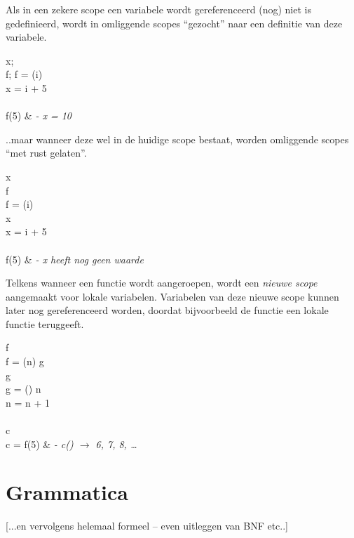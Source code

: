 Als in een zekere scope een variabele wordt gereferenceerd (nog) niet is gedefinieerd, wordt in omliggende scopes ``gezocht'' naar een definitie van deze variabele.

	\begin{SyntaxExample}
		\VAR x; \\
		\VAR f;\; f = \FUN(i) \\
		\IN x = i + 5 \\
		\\
		f(5) & \textit{- x = 10}
	\end{SyntaxExample}

..maar wanneer deze wel in de huidige scope bestaat, worden omliggende scopes ``met rust gelaten''.

	\begin{SyntaxExample}
		\VAR x \\
		\VAR f \\
		f = \FUN(i) \\
		\IN \VAR x \\
		\IN x = i + 5 \\
		\\
		f(5) & \textit{- x heeft nog geen waarde}
	\end{SyntaxExample}

Telkens wanneer een functie wordt aangeroepen, wordt een \emph{nieuwe scope} aangemaakt voor lokale variabelen. Variabelen van deze nieuwe scope kunnen later nog gereferenceerd worden, doordat bijvoorbeeld de functie een lokale functie teruggeeft.

	\begin{SyntaxExample}
		\VAR f \\
		f = \FUN(n) \RETURNS g \\
		\IN \VAR g \\
		\IN g = \FUN() \RETURNS n \\
		\IN \IN n = n + 1 \\
		\\
		\VAR c \\
		c = f(5) & \textit{- c() $\rightarrow$ 6, 7, 8, \dots}
	\end{SyntaxExample}


\section{Grammatica}

[...en vervolgens helemaal formeel -- even uitleggen van BNF etc..]
